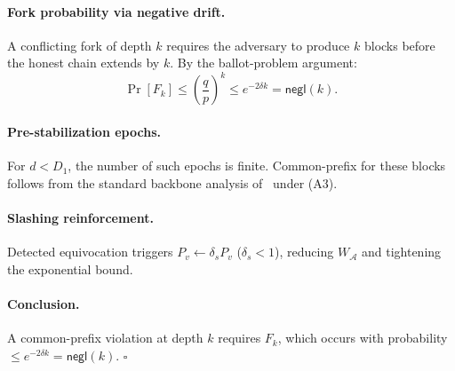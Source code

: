 \documentclass[10pt,journal,twoside]{IEEEtran}
\theoremstyle{remark}
\newcommand{\negl}{\mathsf{negl}}
\begin{document}
	\paragraph{Fork probability via negative drift.}
	A conflicting fork of depth $k$ requires the adversary
	to produce $k$ blocks before the honest chain extends
	by $k$.
	By the ballot-problem argument:
	\[
	\Pr[F_k] \leq \left(\frac{q}{p}\right)^k
	\leq e^{-2\delta k} = \negl(k).
	\]
	
	\paragraph{Pre-stabilization epochs.}
	For $d < D_1$, the number of such epochs is finite.
	Common-prefix for these blocks follows from the standard
	backbone analysis of~\cite{garay2015bitcoin,pass2017hybrid}
	under (A3).
	
	\paragraph{Slashing reinforcement.}
	Detected equivocation triggers $P_v \leftarrow \delta_s P_v$
	($\delta_s < 1$), reducing $W_{\mathcal{A}}$ and
	tightening the exponential bound.
	
	\paragraph{Conclusion.}
	A common-prefix violation at depth $k$ requires $F_k$,
	which occurs with probability $\leq e^{-2\delta k} = \negl(k)$.
	\hfill$\square$
	
	
	
	
\end{document}
